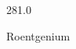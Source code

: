 \documentclass[12pt]{article}
\begin{document}
\hfill{}
\vfill
\begin{center}
  {\fontsize{50}{60}
  }

  281.0

Roentgenium
\end{center}
\vfill
\end{document}
